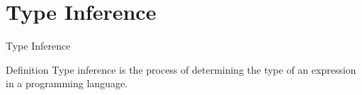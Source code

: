 \section{Type Inference}
\begin{frame}{Type Inference}
    \begin{block}{Definition}
        Type inference is the process of determining the type of an expression in a programming language.
    \end{block}
\end{frame}
